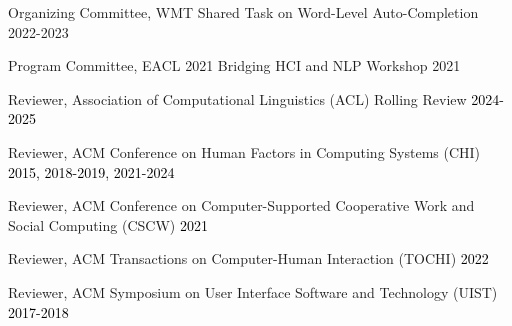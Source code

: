 Organizing Committee, WMT Shared Task on Word-Level Auto-Completion \hfill 2022-2023

Program Committee, EACL 2021 Bridging HCI and NLP Workshop \hfill 2021

Reviewer, Association of Computational Linguistics (ACL) Rolling Review \hfill \textcolor{black}{2024-2025}

Reviewer, ACM Conference on Human Factors in Computing Systems (CHI) \hfill \textcolor{black}{2015, 2018-2019, 2021-2024}


Reviewer, ACM Conference on Computer-Supported Cooperative Work and Social Computing (CSCW) \hfill \textcolor{black}{2021}

Reviewer, ACM Transactions on Computer-Human Interaction (TOCHI) \hfill \textcolor{black}{2022}


Reviewer, ACM Symposium on User Interface Software and Technology (UIST) \hfill \textcolor{black}{2017-2018}\\


% 

% 

% 

% 


%
% 






%
%
%
%
%
%

